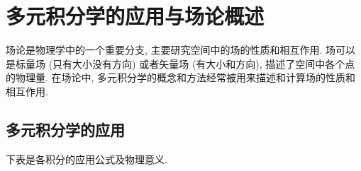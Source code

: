 \section{多元积分学的应用与场论概述}

场论是物理学中的一个重要分支, 主要研究空间中的场的性质和相互作用. 
场可以是标量场 (只有大小没有方向) 或者矢量场 (有大小和方向), 描述了空间中各个点的物理量. 
在场论中, 多元积分学的概念和方法经常被用来描述和计算场的性质和相互作用. 

\subsection{多元积分学的应用}

下表是各积分的应用公式及物理意义.
\setcounter{magicrownumbers}{0}
\begin{table}[H]
    \centering
\end{table}
